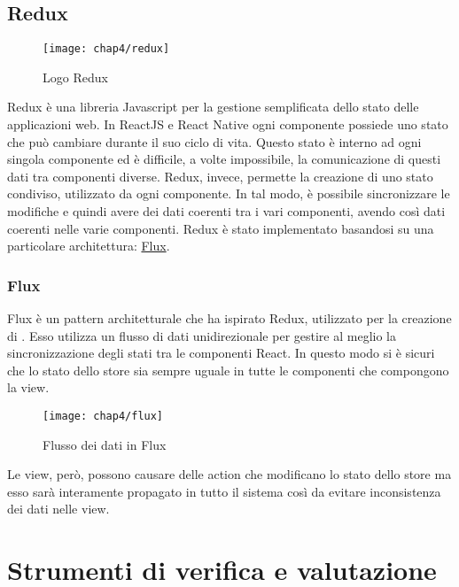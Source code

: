\subsection{Redux}
\begin{figure}[H] 
	\centering
	\texttt{[image: chap4/redux]}
	\caption{Logo Redux}
\end{figure}
Redux è una libreria Javascript per la gestione semplificata dello stato delle applicazioni web. In ReactJS e React Native ogni componente possiede uno stato che può cambiare durante il suo ciclo di vita. Questo stato è interno ad ogni singola componente ed è difficile, a volte impossibile, la comunicazione di questi dati tra componenti diverse.
Redux, invece, permette la creazione di uno stato condiviso, utilizzato da ogni
componente. In tal modo, è possibile sincronizzare le modifiche e quindi avere
dei dati coerenti  tra i vari componenti, avendo così dati coerenti nelle varie
componenti.
Redux è stato implementato basandosi su una particolare architettura:
\hyperref[subsubsec:flux]{Flux}.

\subsubsection{Flux}\label{subsubsec:flux}
 Flux è un pattern architetturale che ha ispirato Redux, utilizzato per la creazione di . Esso utilizza un flusso di dati unidirezionale per gestire al meglio la sincronizzazione degli stati tra le componenti React. In questo modo si è sicuri che lo stato dello store sia sempre uguale in tutte le componenti che compongono la view.
 \begin{figure}[H] 
 	\centering
 	\texttt{[image: chap4/flux]}
 	\caption{Flusso dei dati in Flux}
 \end{figure}
Le view, però, possono causare delle action che modificano lo stato dello store ma esso sarà interamente propagato in tutto il sistema così da evitare inconsistenza dei dati nelle view.

\section{Strumenti di verifica e valutazione}

